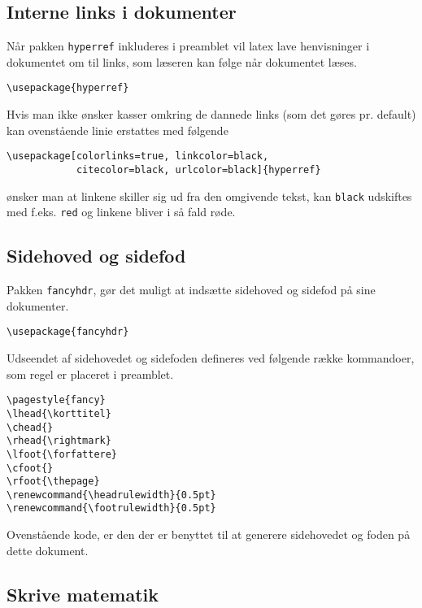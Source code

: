 \documentclass[11pt,a4paper,fleqn]{article}
\newcommand{\forfattere}{Henrik Skov Midtiby}
\newcommand{\korttitel}{Latex rodebunke}
\begin{document}
\subsection{Interne links i dokumenter}

Når pakken \verb!hyperref! inkluderes i preamblet vil latex lave
henvisninger i dokumentet om til links, som læseren kan følge når
%
dokumentet læses.
%
\begin{lstlisting}
\usepackage{hyperref}
\end{lstlisting}
%
Hvis man ikke ønsker kasser omkring de dannede links (som det gøres
pr. default) kan ovenstående linie erstattes med følgende
%
\begin{lstlisting}
\usepackage[colorlinks=true, linkcolor=black, 
            citecolor=black, urlcolor=black]{hyperref}
\end{lstlisting}
%
ønsker man at linkene skiller sig ud fra den omgivende tekst, kan
\verb!black! udskiftes med f.eks. \verb!red! og linkene bliver i så
fald røde.


\subsection{Sidehoved og sidefod}

Pakken \verb!fancyhdr!, gør det muligt at indsætte sidehoved og
sidefod på sine dokumenter.
%
\begin{lstlisting}
\usepackage{fancyhdr}
\end{lstlisting}
%
Udseendet af sidehovedet og sidefoden defineres ved følgende række
kommandoer, som regel er placeret i preamblet.
%
\begin{lstlisting}
\pagestyle{fancy}
\lhead{\korttitel}
\chead{}
\rhead{\rightmark}
\lfoot{\forfattere}
\cfoot{}
\rfoot{\thepage}
\renewcommand{\headrulewidth}{0.5pt}
\renewcommand{\footrulewidth}{0.5pt}
\end{lstlisting}
%
Ovenstående kode, er den der er benyttet til at generere sidehovedet
og foden på dette dokument.

\subsection{Skrive matematik}
\end{document}
